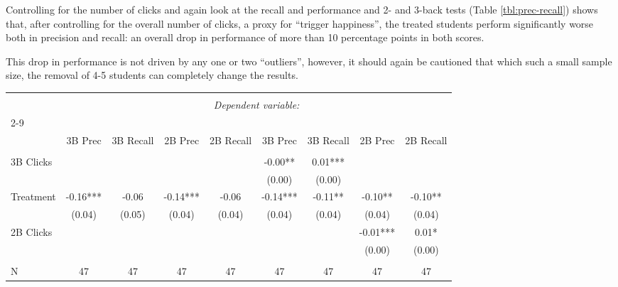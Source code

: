 \documentclass[a4paper,12pt]{article}
\begin{document}
Controlling for the number of clicks and again look at the recall and performance and 2- and 3-back tests (Table \ref{tbl:prec-recall}) shows that, after controlling for the overall number of clicks, a proxy for ``trigger happiness'', the treated students perform significantly worse both in precision and recall: an overall drop in performance of more than 10 percentage points in both scores.

This drop in performance is not driven by any one or two ``outliers'', however, it should again be cautioned that which such a small sample size, the removal of 4-5 students can completely change the results.


\begin{sidewaystable}
\caption{}
\label{tbl:prec-recall}
\begin{center}
\begin{tabular}{@{\extracolsep{5pt}}lcccccccc}
\hline
\hline \\
[-1.8ex] & \multicolumn{8}{c}{\textit{Dependent variable:}} \\
\cline{2-9} \\
[-1.8ex] & 3B Prec & 3B Recall & 2B Prec & 2B Recall & 3B Prec & 3B Recall & 2B Prec & 2B Recall  \\
\hline \\ [-1.8ex]
3B Clicks           &           &             &           &             & -0.00**    & 0.01***      &            &               \\
                             &           &             &           &             & (0.00)     & (0.00)       &            &               \\
Treatment                      & -0.16***  & -0.06       & -0.14***  & -0.06       & -0.14***   & -0.11**      & -0.10**    & -0.10**       \\
                             & (0.04)    & (0.05)      & (0.04)    & (0.04)      & (0.04)     & (0.04)       & (0.04)     & (0.04)        \\
2B Clicks             &           &             &           &             &            &              & -0.01***   & 0.01*         \\
                             &           &             &           &             &            &              & (0.00)     & (0.00)        \\
\hline \\[-1.8ex]
N                  & 47        & 47          & 47        & 47          & 47         & 47           & 47         & 47            \\

\end{tabular}
\end{center}
\end{sidewaystable}
\end{document}
